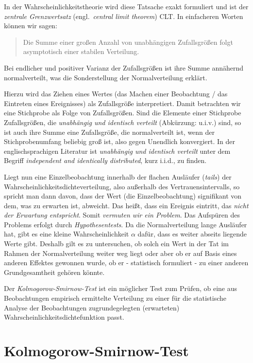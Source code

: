 In der Wahrscheinlichkeitstheorie wird diese Tatsache exakt formuliert und ist der
\textsl{zentrale Grenzwertsatz} (engl.\ \textsl{central limit theorem}) CLT.
In einfacheren Worten können wir sagen:
\begin{quote}
Die Summe einer großen Anzahl von unabhängigen Zufallsgrößen folgt
asymptotisch einer stabilen Verteilung.
\end{quote}
Bei endlicher und positiver Varianz der Zufallsgrößen ist ihre Summe annähernd
normalverteilt, was die Sonderstellung der Normalverteilung erklärt.

Hierzu wird das Ziehen eines Wertes (das Machen einer Beobachtung / das Eintreten eines
Ereignisses) als Zufallsgröße interpretiert.
Damit betrachten wir eine Stichprobe als Folge von Zufallsgrößen. Sind die Elemente
einer Stichprobe Zufallsgrößen, die
\textsl{unabhängig und identisch verteilt} (Abkürzung: u.i.v.) sind, so ist auch ihre Summe
eine Zufallsgröße, die normalverteilt ist, wenn der Stichprobenumfang beliebig groß ist,
also gegen Unendlich konvergiert. In der englischsprachigen Literatur ist
\textsl{unabhängig und identisch verteilt} unter dem Begriff
\textsl{independent and identically distributed}, kurz i.i.d., zu finden.

Liegt nun eine Einzelbeobachtung innerhalb der flachen
Ausläufer (\textsl{tails}) der Wahrscheinlichkeitsdichteverteilung,
also außerhalb des Vertrauensintervalls, so
spricht man dann davon, dass der Wert (die Einzelbeobachtung)
signifikant von dem, was zu erwarten ist, abweicht. Das heißt, dass ein Ereignis eintritt,
das \textsl{nicht der Erwartung entspricht}. Somit \textsl{vermuten wir ein Problem}. Das Aufspüren
des Problems erfolgt durch \textsl{Hypothesentests}. Da die Normalverteilung
lange Ausläufer hat, gibt es eine kleine Wahrscheinlichkeit $\alpha$ dafür, dass es
weiter abseits liegende Werte gibt. Deshalb gilt es zu untersuchen,
ob solch ein Wert in der Tat im Rahmen der Normalverteilung weiter weg liegt
oder aber ob er auf Basis eines anderen Effektes gewonnen
wurde, ob er - statistisch formuliert - zu einer anderen Grundgesamtheit gehören könnte.

Der \textsl{Kolmogorow-Smirnow-Test} ist ein möglicher Test zum Prüfen, ob eine aus Beobachtungen
empirisch ermittelte Verteilung zu einer für die statistische Analyse der Beobachtungen
zugrundegelegten (erwarteten) Wahrscheinlichkeitsdichtefunktion passt.


\section{Kolmogorow-Smirnow-Test}

